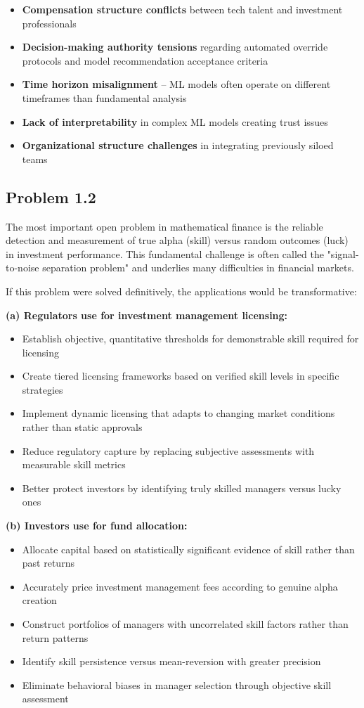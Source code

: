 \documentclass{article}
\begin{document}
\begin{sloppypar}
\begin{itemize}
\item \textbf{Compensation structure conflicts} between tech talent and investment professionals
\item \textbf{Decision-making authority tensions} regarding automated override protocols and model recommendation acceptance criteria
\item \textbf{Time horizon misalignment} -- ML models often operate on different timeframes than fundamental analysis
\item \textbf{Lack of interpretability} in complex ML models creating trust issues
\item \textbf{Organizational structure challenges} in integrating previously siloed teams
\end{itemize}

\subsection{Problem 1.2}

The most important open problem in mathematical finance is the reliable detection and measurement of true alpha (skill) versus random outcomes (luck) in investment performance. This fundamental challenge is often called the "signal-to-noise separation problem" and underlies many difficulties in financial markets.

If this problem were solved definitively, the applications would be transformative:

\textbf{(a) Regulators use for investment management licensing:}
\begin{itemize}
    \item Establish objective, quantitative thresholds for demonstrable skill required for licensing
    \item Create tiered licensing frameworks based on verified skill levels in specific strategies
    \item Implement dynamic licensing that adapts to changing market conditions rather than static approvals
    \item Reduce regulatory capture by replacing subjective assessments with measurable skill metrics
    \item Better protect investors by identifying truly skilled managers versus lucky ones
\end{itemize}

\textbf{(b) Investors use for fund allocation:}
\begin{itemize}
    \item Allocate capital based on statistically significant evidence of skill rather than past returns
    \item Accurately price investment management fees according to genuine alpha creation
    \item Construct portfolios of managers with uncorrelated skill factors rather than return patterns
    \item Identify skill persistence versus mean-reversion with greater precision
    \item Eliminate behavioral biases in manager selection through objective skill assessment
\end{itemize}


\end{sloppypar}
\end{document}
